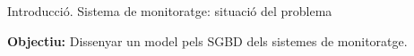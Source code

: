 




\begin{frame}{Introducció. Sistema de monitoratge: situació del problema}




      
      
      


\textbf{Objectiu:} Dissenyar un model pels SGBD dels sistemes de monitoratge.
\end{frame}




